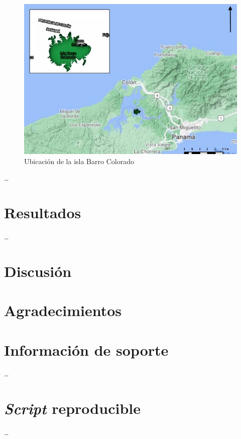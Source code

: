 \documentclass[11pt,]{article}
\begin{document}
\begin{figure}
\centering
\includegraphics{mapa_barro_colorado.jpeg}
\caption{Ubicación de la isla Barro Colorado\label{mapa}}
\end{figure}

\ldots

\section{Resultados}\label{resultados}

\ldots

\section{Discusión}\label{discusiuxf3n}

\section{Agradecimientos}\label{agradecimientos}

\section{Información de soporte}\label{informaciuxf3n-de-soporte}

\ldots

\section{\texorpdfstring{\emph{Script}
reproducible}{Script reproducible}}\label{script-reproducible}

\ldots
\end{document}

